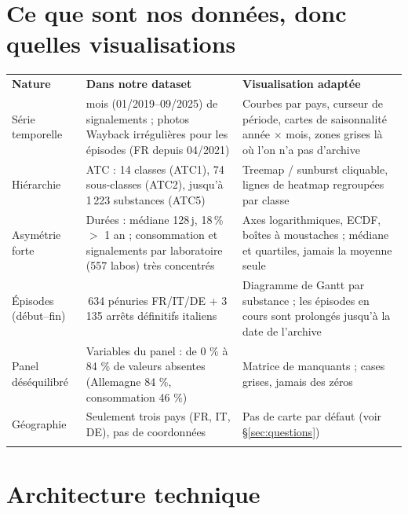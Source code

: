 \documentclass[10.5pt, a4paper]{article}
\newcommand{\entete}[1]{\textbf{\color{gris!20!black}#1}}
\newcommand{\filet}{\arrayrulecolor{gris!40}\hline}
\begin{document}
\section{Ce que sont nos données, donc quelles visualisations}\label{sec:nature}

\begin{tabularx}{\linewidth}{>{\raggedright\arraybackslash}p{3.1cm} >{\raggedright\arraybackslash}X >{\raggedright\arraybackslash}p{4.6cm}}
\rowcolor{gris!14}\entete{Nature} & \entete{Dans notre dataset} & \entete{Visualisation adaptée}\\
Série temporelle & 81 mois (01/2019--09/2025) de signalements ; photos Wayback irrégulières pour les épisodes
(FR depuis 04/2021) & Courbes par pays, curseur de période, cartes de saisonnalité année $\times$ mois, zones grises
là où l'on n'a pas d'archive \\
Hiérarchie & ATC : 14 classes (ATC1), 74 sous-classes (ATC2), jusqu'à 1\,223 substances (ATC5) & Treemap / sunburst
cliquable, lignes de heatmap regroupées par classe \\
Asymétrie forte & Durées : médiane 128\,j, 18\,\% $>$ 1 an ; consommation et signalements par laboratoire
(557 labos) très concentrés & Axes logarithmiques, ECDF, boîtes à moustaches ; médiane et quartiles, jamais la moyenne seule \\
Épisodes (début--fin) & 13\,634 pénuries FR/IT/DE + 3\,135 arrêts définitifs italiens & Diagramme de Gantt par
substance ; les épisodes en cours sont prolongés jusqu'à la date de l'archive \\
Panel déséquilibré & Variables du panel : de 0 \% à 84 \% de valeurs absentes (Allemagne 84 \%, consommation 46 \%) &
Matrice de manquants ; cases grises, jamais des zéros \\
Géographie & Seulement trois pays (FR, IT, DE), pas de coordonnées & Pas de carte par défaut (voir §\ref{sec:questions}) \\
\filet
\end{tabularx}

\section{Architecture technique}
\end{document}
